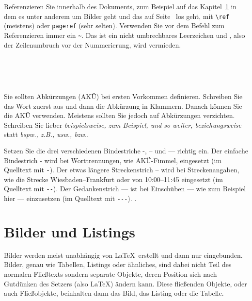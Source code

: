 \documentclass[11pt,a4paper]{report}
\begin{document}
Referenzieren Sie innerhalb des Dokuments, zum Beispiel
auf das Kapitel~\ref{chap:bilder} in dem es unter anderem
um Bilder geht und das auf Seite~\pageref{chap:bilder}
los geht, mit \verb|\ref| (meistens) oder 
\verb|pageref| (sehr selten). 
Verwenden Sie vor dem Befehl zum Referenzieren immer
ein \verb|~|. Das ist ein nicht umbrechbares Leerzeichen
und , also der 
Zeilenumbruch vor der Nummerierung, wird vermieden.

\newline
{}\\ 
\\
\\

Sie sollten Abkürzungen (AKÜ) bei ersten Vorkommen definieren.
Schreiben Sie das Wort zuerst aus und dann die Abkürzung in 
Klammern. 
Danach können Sie die AKÜ verwenden. 
Meistens sollten Sie jedoch auf Abkürzungen verzichten.
Schreiben Sie lieber
\textit{beispielsweise, zum Beispiel, und so weiter, beziehungsweise}
statt \textit{bspw., z.B., usw., bzw.}.

Setzen Sie die drei verschiedenen Bindestriche -, -- und --- richtig
ein. 
Der einfache Bindestrich - wird bei Worttrennungen, 
wie AKÜ-Fimmel, eingesetzt (im Quelltext mit \verb|-|).
Der etwas längere Streckenstrich -- wird bei Streckenangaben, wie
die Strecke Wiesbaden--Frankfurt oder von 10:00--11:45 eingesetzt
(im Quelltext mit \verb|--|).
Der Gedankenstrich --- ist bei Einschüben --- wie zum Beispiel
hier --- einzusetzen (im Quelltext mit \verb|---|).
.

\chapter{Bilder und Listings} \label{chap:bilder}

Bilder werden meist unabhängig von \LaTeX\ erstellt und dann nur 
eingebunden. 
Bilder, genau wie Tabellen, Listings oder ähnliches, sind dabei nicht 
Teil des normalen Fließtexts sondern separate Objekte, 
deren Position sich nach Gutdünken des Setzers (also \LaTeX) 
ändern kann.
Diese fließenden Objekte, oder auch Fließobjekte,
beinhalten dann das Bild, das Listing oder die Tabelle.
\end{document}
